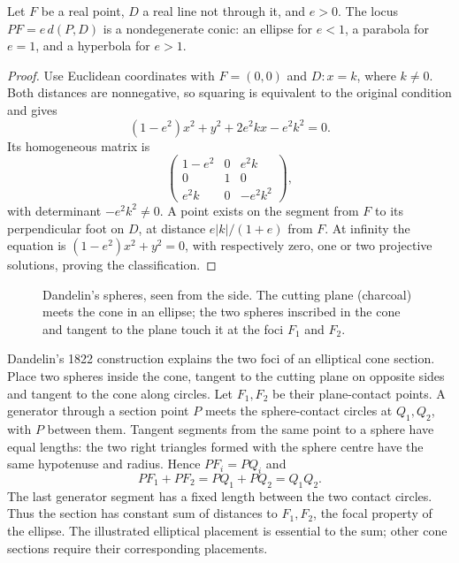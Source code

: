 \begin{proposition}\label{geometry:prop:focus}
Let $F$ be a real point, $D$ a real line not through it, and $e>0$. The locus $PF=e\,d(P,D)$ is a nondegenerate conic: an ellipse for $e<1$, a parabola for $e=1$, and a hyperbola for $e>1$.
\end{proposition}
\begin{proof}
Use Euclidean coordinates with $F=(0,0)$ and $D:x=k$, where $k\ne0$. Both distances are nonnegative, so squaring is equivalent to the original condition and gives
\[
(1-e^2)x^2+y^2+2e^2kx-e^2k^2=0.
\]
Its homogeneous matrix is
\[
\begin{pmatrix}1-e^2&0&e^2k\\0&1&0\\e^2k&0&-e^2k^2\end{pmatrix},
\]
with determinant $-e^2k^2\ne0$. A point exists on the segment from $F$ to its perpendicular foot on $D$, at distance $e|k|/(1+e)$ from $F$. At infinity the equation is $(1-e^2)x^2+y^2=0$, with respectively zero, one or two projective solutions, proving the classification.
\end{proof}

\begin{figure}[ht]
\centering
{}
\caption{Dandelin's spheres, seen from the side. The cutting plane (charcoal) meets the cone in an ellipse; the two spheres inscribed in the cone and
tangent to the plane touch it at the foci $F_1$ and $F_2$.}
\label{geometry:fig:dandelin}
\end{figure}

\begin{beauty}
Dandelin's 1822 construction explains the two foci of an elliptical cone section. Place two spheres inside the cone, tangent to the cutting plane on opposite sides and tangent to the cone along circles. Let $F_1,F_2$ be their plane-contact points. A generator through a section point $P$ meets the sphere-contact circles at $Q_1,Q_2$, with $P$ between them. Tangent segments from the same point to a sphere have equal lengths: the two right triangles formed with the sphere centre have the same hypotenuse and radius. Hence $PF_i=PQ_i$ and
\[
PF_1+PF_2=PQ_1+PQ_2=Q_1Q_2.
\]
The last generator segment has a fixed length between the two contact circles. Thus the section has constant sum of distances to $F_1,F_2$, the focal property of the ellipse. The illustrated elliptical placement is essential to the sum; other cone sections require their corresponding placements.
\end{beauty}

